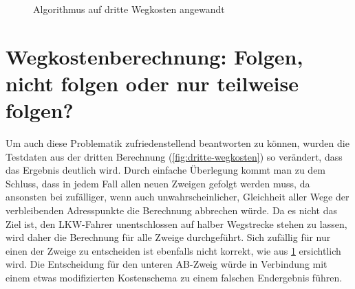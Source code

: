 \begin{figure}[H]
	\centering
	\caption{Algorithmus auf dritte Wegkosten angewandt
		\label{fig:dritte-algorithmus}}
\end{figure}



\section{Wegkostenberechnung: Folgen, nicht folgen oder nur teilweise folgen?}
\label{sec:wegkostenberechnung}

Um auch diese Problematik zufriedenstellend beantworten zu können, wurden die Testdaten aus der dritten Berechnung (\cref{fig:dritte-wegkosten}) so verändert, dass das Ergebnis deutlich wird. Durch einfache Überlegung kommt man zu dem Schluss, dass in jedem Fall allen neuen Zweigen gefolgt werden muss, da ansonsten bei zufälliger, wenn auch unwahrscheinlicher, Gleichheit aller Wege der verbleibenden Adresspunkte die Berechnung abbrechen würde. Da es nicht das Ziel ist, den LKW-Fahrer unentschlossen auf halber Wegstrecke stehen zu lassen, wird daher die Berechnung für alle Zweige durchgeführt. Sich zufällig für nur einen der Zweige zu entscheiden ist ebenfalls nicht korrekt, wie aus \cref{fig:dritte-algorithmus} ersichtlich wird. Die Entscheidung für  den unteren AB-Zweig würde in Verbindung mit einem etwas modifizierten Kostenschema zu einem falschen Endergebnis führen.


